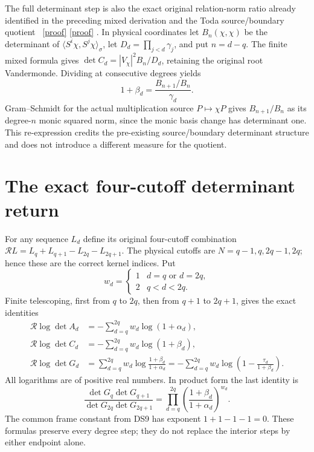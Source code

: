 \documentclass[11pt]{article}
\begin{document}
The full determinant step is also the exact original relation-norm
ratio already identified in the preceding mixed derivation and the
Toda source/boundary quotient \cite{dsroot:Mixed,dsroot:Toda}%
~\href{https://github.com/KokunoYumeto/zeta-function-research-reader/blob/5992ad50c0f2a06921f1fcaded7b4e38097c0739/workbenches/splitzero-tandem/continuations/20260920-original-kernel-mixed-determinants/MIXED_CONFLUENT_PROOF.tex\#L1}{[proof]} \href{https://github.com/KokunoYumeto/zeta-function-research-reader/blob/5992ad50c0f2a06921f1fcaded7b4e38097c0739/workbenches/splitzero-tandem/continuations/20260920-original-kernel-mixed-determinants/providers/TODA_VOLUME_CONTROL.tex\#L1}{[proof]}%
{}. In physical coordinates
let \(B_n(\chi,\chi)\) be the determinant of
\(\langle S^i\chi,S^j\chi\rangle_\sigma\), let
\(D_d=\prod_{j<d}\gamma_j\), and put \(n=d-q\).
The finite mixed formula gives
\(\det C_d=|V_\chi|^2B_n/D_d\), retaining the original root
Vandermonde. Dividing at consecutive degrees yields
\[
1+\beta_d=\frac{B_{n+1}/B_n}{\gamma_d}.
\]
Gram--Schmidt for the actual multiplication source
\(P\mapsto\chi P\) gives \(B_{n+1}/B_n\) as its degree-\(n\)
monic squared norm, since the monic basis change has determinant one.
This re-expression credits the pre-existing source/boundary determinant
structure and does not introduce a different measure for the quotient.

\section{The exact four-cutoff determinant return}

For any sequence \(L_d\) define its original four-cutoff combination
\(\mathcal RL=L_q+L_{q+1}-L_{2q}-L_{2q+1}\).
The physical cutoffs are \(N=q-1,q,2q-1,2q\); hence these are the
correct kernel indices. Put
\[
w_d=\begin{cases}1&d=q\text{ or }d=2q,\\2&q<d<2q.\end{cases}
\]
Finite telescoping, first from \(q\) to \(2q\), then from \(q+1\)
to \(2q+1\), gives the exact identities
\begin{equation}\label{dsroot:eq:return}
\boxed{\begin{aligned}
\mathcal R\log\det A_d
&=-\sum_{d=q}^{2q}w_d\log(1+\alpha_d),\\
\mathcal R\log\det C_d
&=-\sum_{d=q}^{2q}w_d\log(1+\beta_d),\\
\mathcal R\log\det G_d
&=\sum_{d=q}^{2q}w_d
 \log\frac{1+\beta_d}{1+\alpha_d}
=-\sum_{d=q}^{2q}w_d
 \log\left(1-\frac{\tau_d}{1+\beta_d}\right).
\end{aligned}}
\tag{DS13}
\end{equation}
All logarithms are of positive real numbers. In product form the last
identity is
\[
\frac{\det G_q\det G_{q+1}}{\det G_{2q}\det G_{2q+1}}
=\prod_{d=q}^{2q}\left(\frac{1+\beta_d}{1+\alpha_d}\right)^{w_d}.
\]
The common frame constant from DS9 has exponent \(1+1-1-1=0\).
These formulas preserve every degree step; they do not replace the
interior steps by either endpoint alone.
\end{document}
